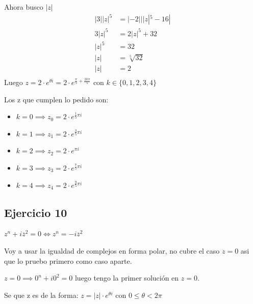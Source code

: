 Ahora busco $ |z| $
\begin{align*}
    |3||z|^5 &= |-2|||z|^5 - 16| \\
    3|z|^5 &= 2|z|^5 + 32 \\
    |z|^5 &= 32 \\
    |z| &= \sqrt[5]{32} \\
    |z| &= 2 \\
\end{align*}
Luego $ z = 2 \cdot e^{\theta i} = 2 \cdot e^{\frac{\pi}{5} + \frac{2k\pi}{5}} $ con $ k \in \{0,1,2,3,4\} $

Los z que cumplen lo pedido son:
\begin{itemize}
    \item $ k = 0 \implies z_0 = 2 \cdot e^{\frac{1}{5}\pi i} $
    \item $ k = 1 \implies z_1 = 2 \cdot e^{\frac{3}{5}\pi i} $
    \item $ k = 2 \implies z_2 = 2 \cdot e^{\pi i} $
    \item $ k = 3 \implies z_3 = 2 \cdot e^{\frac{7}{5}\pi i} $
    \item $ k = 4 \implies z_4 = 2 \cdot e^{\frac{9}{5}\pi i} $
\end{itemize}

\subsection{Ejercicio 10}

$ z^n + i\overline{z}^2 = 0 \iff z^n = - i\overline{z}^2$

Voy a usar la igualdad de complejos en forma polar, no cubre el caso $ z = 0 $ asi que lo pruebo primero como caso aparte.

$ z = 0 \implies 0^n + i 0^2 = 0 $ luego tengo la primer solución en $ z = 0 $.

Se que z es de la forma: $ z = |z|\cdot e^{\theta i} $ con $ 0 \leq \theta < 2\pi $

